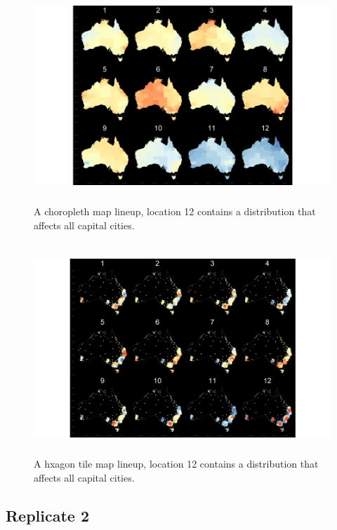 \documentclass{monashthesis}
\begin{document}
\begin{figure}[H]
\centering
\includegraphics[height=8cm]{lineups/cities-geo12-1.pdf}
\caption{\label{fig:cities-geo12}A choropleth map lineup, location 12 contains a distribution that affects all capital cities.}
\end{figure}

\begin{figure}[H]
\centering
\includegraphics[height=8cm]{lineups/cities-hex12-1.pdf}
\caption{\label{fig:cities-hex12}A hxagon tile map lineup, location 12 contains a distribution that affects all capital cities.}
\end{figure}

\hypertarget{replicate-2}{%
\subsection{Replicate 2}\label{replicate-2}}
\end{document}
